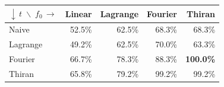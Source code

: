 \begin{tabular}{lrrrr}
\toprule
$\downarrow\,t\;\backslash\;f_0\,\rightarrow$
  & Linear & Lagrange & Fourier & Thiran \\
\midrule
Naive    & 52.5\% & 62.5\% & 68.3\% & 68.3\% \\
Lagrange & 49.2\% & 62.5\% & 70.0\% & 63.3\% \\
Fourier  & 66.7\% & 78.3\% & 88.3\% & \textbf{100.0\%} \\
Thiran   & 65.8\% & 79.2\% & 99.2\% & 99.2\% \\
\bottomrule
\end{tabular}
